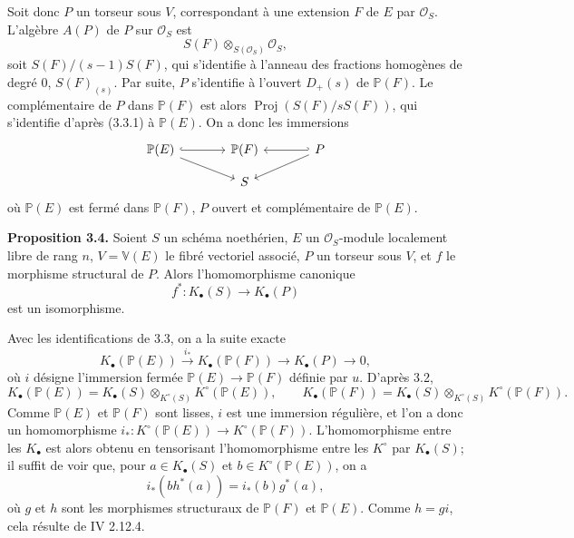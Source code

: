 \documentclass[11pt]{article}
\begin{document}
Soit donc $P$ un torseur sous $V$, correspondant à une extension $F$ de $E$ par $\mathcal O_S$. L'algèbre $A(P)$ de $P$ sur $\mathcal O_S$ est
\[
S(F)\otimes_{S(\mathcal O_S)}\mathcal O_S,
\]
soit $S(F)/(s-1)S(F)$, qui s'identifie à l'anneau des fractions homogènes de degré $0$, $S(F)_{(s)}$. Par suite, $P$ s'identifie à l'ouvert $D_+(s)$ de $\mathbb P(F)$. Le complémentaire de $P$ dans $\mathbb P(F)$ est alors $\operatorname{Proj}(S(F)/sS(F))$, qui s'identifie d'après (3.3.1) à $\mathbb P(E)$. On a donc les immersions
\[
\begin{tikzcd}[column sep=large,row sep=small]
\mathbb P(E) \arrow[r,hook] \arrow[dr] & \mathbb P(F) & P \arrow[l,hook'] \arrow[dl]\\
& S &
\end{tikzcd}
\]
où $\mathbb P(E)$ est fermé dans $\mathbb P(F)$, $P$ ouvert et complémentaire de $\mathbb P(E)$.

\textbf{Proposition 3.4.} Soient $S$ un schéma noethérien, $E$ un $\mathcal O_S$-module localement libre de rang $n$, $V=\mathbb V(E)$ le fibré vectoriel associé, $P$ un torseur sous $V$, et $f$ le morphisme structural de $P$. Alors l'homomorphisme canonique
\[
f^*:K_\bullet(S)\longrightarrow K_\bullet(P)
\]
est un isomorphisme.

Avec les identifications de 3.3, on a la suite exacte
\[
K_\bullet(\mathbb P(E))\xrightarrow{i_*}K_\bullet(\mathbb P(F))\longrightarrow K_\bullet(P)\longrightarrow 0,
\tag{3.4.1}
\]
où $i$ désigne l'immersion fermée $\mathbb P(E)\to \mathbb P(F)$ définie par $u$. D'après 3.2,
\[
K_\bullet(\mathbb P(E))=K_\bullet(S)\otimes_{K^\circ(S)}K^\circ(\mathbb P(E)),\qquad
K_\bullet(\mathbb P(F))=K_\bullet(S)\otimes_{K^\circ(S)}K^\circ(\mathbb P(F)).
\]
Comme $\mathbb P(E)$ et $\mathbb P(F)$ sont lisses, $i$ est une immersion régulière, et l'on a donc un homomorphisme $i_*:K^\circ(\mathbb P(E))\to K^\circ(\mathbb P(F))$. L'homomorphisme entre les $K_\bullet$ est alors obtenu en tensorisant l'homomorphisme entre les $K^\circ$ par $K_\bullet(S)$; il suffit de voir que, pour $a\in K_\bullet(S)$ et $b\in K^\circ(\mathbb P(E))$, on a
\[
i_*(b h^*(a))=i_*(b)g^*(a),
\]
où $g$ et $h$ sont les morphismes structuraux de $\mathbb P(F)$ et $\mathbb P(E)$. Comme $h=gi$, cela résulte de IV 2.12.4.
\end{document}
